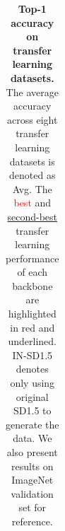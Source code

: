 \begin{table}[t]
{\begin{tabular}{ll|c|ccccccccc}
    \bottomrule
    \end{tabular}}
    \caption{
        \textbf{Top-1 accuracy on transfer learning datasets.} The average accuracy across eight transfer learning datasets is denoted as Avg. The \textcolor{red}{best} and \underline{second-best} transfer learning performance of each backbone are highlighted in red and underlined. IN-SD1.5 denotes only using original SD1.5 to generate the data. We also present results on ImageNet validation set for reference.}
    \label{tab:transfer}
    \vspace{-1em}
\end{table}
